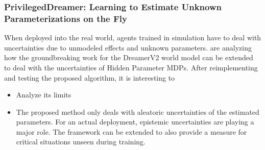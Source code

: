 \documentclass[a4paper]{article}
\begin{document}



\subsubsection{PrivilegedDreamer: Learning to Estimate Unknown Parameterizations on the Fly}
When deployed into the real world, agents trained in simulation have to deal with uncertainties due to unmodeled effects and unknown parameters.
\citet{Byrd2025} are analyzing how the groundbreaking work for the DreamerV2 world model \cite{Hafner2021} can be extended to deal with the uncertainties of Hidden Parameter MDPs.
After reimplementing and testing the proposed algorithm, it is interesting to
\begin{itemize}
  \item Analyze its limits
  \item The proposed method only deals with aleatoric uncertainties of the estimated parameters.
        For an actual deployment, epistemic uncertainties are playing a major role.
        The framework can be extended to also provide a measure for critical situations unseen during training.
\end{itemize}

\end{document}
